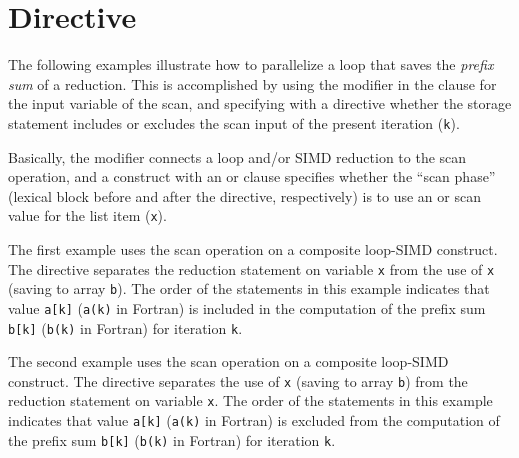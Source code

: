\pagebreak
\section{ Directive}
\label{sec:scan}

The following examples illustrate how to parallelize a loop that saves 
the \emph{prefix sum} of a reduction. This is accomplished by using 
the  modifier in the  clause for the input 
variable of the scan, and specifying with a  directive whether 
the storage statement includes or excludes the scan input of the present 
iteration (\texttt{k}).

Basically, the  modifier connects a loop and/or SIMD reduction to 
the scan operation, and a  construct with an  or 
 clause specifies whether the ``scan phase'' (lexical block 
before and after the directive, respectively) is to use an  or 
 scan value for the list item (\texttt{x}).

The first example uses the  scan operation on a composite
loop-SIMD construct. The  directive separates the reduction 
statement on variable \texttt{x} from the use of \texttt{x} (saving to array \texttt{b}).
The order of the statements in this example indicates that
value \texttt{a[k]} (\texttt{a(k)} in Fortran) is included in the computation of 
the prefix sum \texttt{b[k]} (\texttt{b(k)} in Fortran) for iteration \texttt{k}.



The second example uses the  scan operation on a composite
loop-SIMD construct. The  directive separates the use of \texttt{x} 
(saving to array \texttt{b}) from the reduction statement on variable \texttt{x}.
The order of the statements in this example indicates that
value \texttt{a[k]} (\texttt{a(k)} in Fortran) is excluded from the computation 
of the prefix sum \texttt{b[k]} (\texttt{b(k)} in Fortran) for iteration \texttt{k}.


